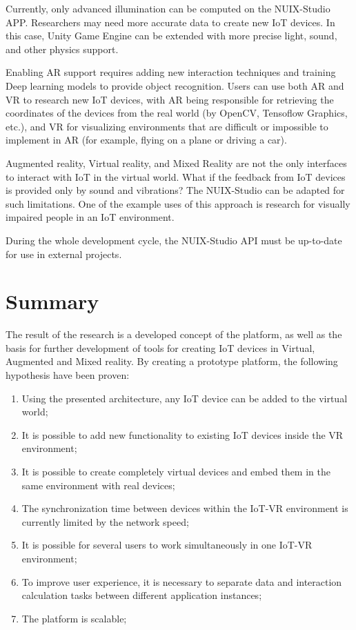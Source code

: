 Currently, only advanced illumination can be computed on the NUIX-Studio APP. Researchers may need more accurate data to create new IoT devices. In this case, Unity Game Engine can be extended with more precise light, sound, and other physics support.

Enabling AR support requires adding new interaction techniques and training Deep learning models to provide object recognition. Users can use both AR and VR to research new IoT devices, with AR being responsible for retrieving the coordinates of the devices from the real world (by OpenCV, Tensoflow Graphics, etc.), and VR for visualizing environments that are difficult or impossible to implement in AR (for example, flying on a plane or driving a car).

Augmented reality, Virtual reality, and Mixed Reality are not the only interfaces to interact with IoT in the virtual world. What if the feedback from IoT devices is provided only by sound and vibrations? The NUIX-Studio can be adapted for such limitations. One of the example uses of this approach is research for visually impaired people in an IoT environment.

During the whole development cycle, the NUIX-Studio API must be up-to-date for use in external projects. 

\section{Summary}


The result of the research is a developed concept of the platform, as well as the basis for further development of tools for creating IoT devices in Virtual, Augmented and Mixed reality. By creating a prototype platform, the following hypothesis have been proven:

\begin{enumerate}
    \item  Using the presented architecture, any IoT device can be added to the virtual world;
    \item It is possible to add new functionality to existing IoT devices inside the VR environment;
    \item It is possible to create completely virtual devices and embed them in the same environment with real devices;
    \item The synchronization time between devices within the IoT-VR environment is currently limited by the network speed;
    \item It is possible for several users to work simultaneously in one IoT-VR environment;
    \item To improve user experience, it is necessary to separate data and interaction calculation tasks between different application instances;
    \item The platform is scalable;
\end{enumerate}


